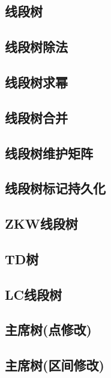 \documentclass{article}
\begin{document}
\subsection{线段树} 

\subsection{线段树除法} 

\subsection{线段树求幂} 

\subsection{线段树合并} 

\subsection{线段树维护矩阵} 

\subsection{线段树标记持久化} 

\subsection{ZKW线段树} 

\subsection{TD树} 

\subsection{LC线段树} 

\subsection{主席树(点修改)} 

\subsection{主席树(区间修改)} 

\end{document}
